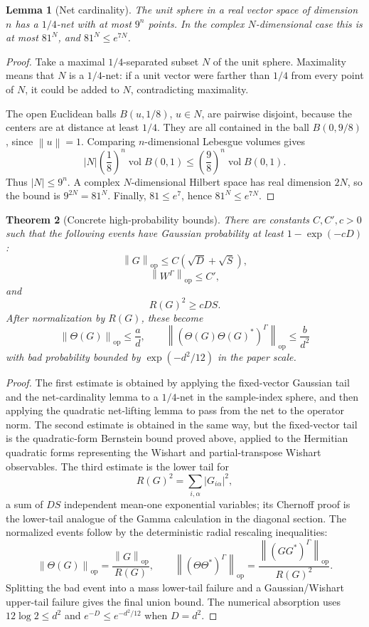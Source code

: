 \documentclass[11pt,oneside]{book}
\newtheorem{theorem}{Theorem}[chapter]
\newtheorem{lemma}[theorem]{Lemma}
\DeclareMathOperator{\vol}{vol}
\newcommand{\1}{\mathbf 1}
\newcommand{\pt}{\Gamma}
\newcommand{\op}{\mathrm{op}}
\newcommand{\norm}[1]{\left\|#1\right\|}
\begin{document}
\begin{lemma}[Net cardinality]
The unit sphere in a real vector space of dimension \(n\) has a \(1/4\)-net
with at most \(9^n\) points.  In the complex \(N\)-dimensional case this is
at most \(81^N\), and \(81^N\le e^{7N}\).
\end{lemma}

\begin{proof}
Take a maximal \(1/4\)-separated subset \(N\) of the unit sphere.  Maximality
means that \(N\) is a \(1/4\)-net: if a unit vector were farther than \(1/4\)
from every point of \(N\), it could be added to \(N\), contradicting
maximality.

The open Euclidean balls \(B(u,1/8)\), \(u\in N\), are pairwise disjoint,
because the centers are at distance at least \(1/4\).  They are all contained
in the ball \(B(0,9/8)\), since \(\norm u=1\).  Comparing \(n\)-dimensional
Lebesgue volumes gives
\[
  |N|\left(\frac18\right)^n\vol B(0,1)
  \le
  \left(\frac98\right)^n\vol B(0,1).
\]
Thus \(|N|\le9^n\).  A complex \(N\)-dimensional Hilbert space has real
dimension \(2N\), so the bound is \(9^{2N}=81^N\).  Finally,
\(81\le e^7\), hence \(81^N\le e^{7N}\).
\end{proof}

\begin{theorem}[Concrete high-probability bounds]
There are constants \(C,C',c>0\) such that the following events have Gaussian
probability at least \(1-\exp(-cD)\):
\[
  \norm G_{\op}\le C(\sqrt D+\sqrt S),
\]
\[
  \norm{W^\pt}_{\op}\le C',
\]
and
\[
  R(G)^2\ge cDS.
\]
After normalization by \(R(G)\), these become
\[
  \norm{\Theta(G)}_{\op}\le \frac a d,\qquad
  \norm{(\Theta(G)\Theta(G)^*)^\pt}_{\op}\le \frac b{d^2}
\]
with bad probability bounded by \(\exp(-d^2/12)\) in the paper scale.
\end{theorem}

\begin{proof}
The first estimate is obtained by applying the fixed-vector Gaussian tail and
the net-cardinality lemma to a \(1/4\)-net in the sample-index sphere, and
then applying the quadratic net-lifting lemma to pass from the net to the
operator norm.  The second estimate is obtained in the same way, but the
fixed-vector tail is the quadratic-form Bernstein bound proved above, applied
to the Hermitian quadratic forms representing the Wishart and
partial-transpose Wishart observables.  The third estimate is the lower tail
for
\[
  R(G)^2=\sum_{i,\alpha}|G_{i\alpha}|^2,
\]
a sum of \(DS\) independent mean-one exponential variables; its Chernoff proof
is the lower-tail analogue of the Gamma calculation in the diagonal section.
The normalized events follow by the deterministic radial rescaling inequalities:
\[
  \norm{\Theta(G)}_{\op}=\frac{\norm G_{\op}}{R(G)},\qquad
  \norm{(\Theta\Theta^*)^\pt}_{\op}
  =\frac{\norm{(GG^*)^\pt}_{\op}}{R(G)^2}.
\]
Splitting the bad event into a mass lower-tail failure and a Gaussian/Wishart
upper-tail failure gives the final union bound.  The numerical absorption
uses \(12\log2\le d^2\) and \(e^{-D}\le e^{-d^2/12}\) when \(D=d^2\).
\end{proof}
\end{document}
